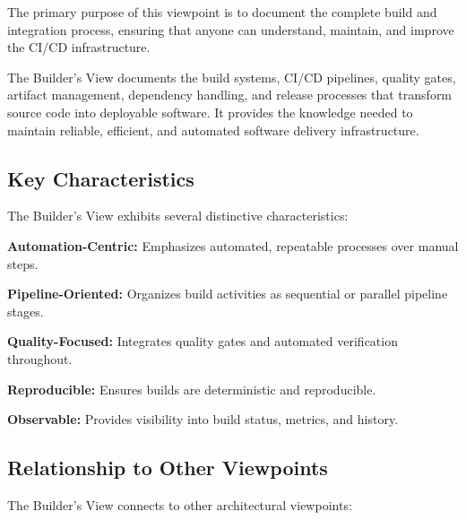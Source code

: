 \documentclass[11pt,letterpaper]{article}
\begin{document}
The primary purpose of this viewpoint is to document the complete build and integration process, ensuring that anyone can understand, maintain, and improve the CI/CD infrastructure.

\begin{definitionbox}
The Builder's View documents the build systems, CI/CD pipelines, quality gates, artifact management, dependency handling, and release processes that transform source code into deployable software. It provides the knowledge needed to maintain reliable, efficient, and automated software delivery infrastructure.
\end{definitionbox}

\subsection{Key Characteristics}

The Builder's View exhibits several distinctive characteristics:

\textbf{Automation-Centric:} Emphasizes automated, repeatable processes over manual steps.

\textbf{Pipeline-Oriented:} Organizes build activities as sequential or parallel pipeline stages.

\textbf{Quality-Focused:} Integrates quality gates and automated verification throughout.

\textbf{Reproducible:} Ensures builds are deterministic and reproducible.

\textbf{Observable:} Provides visibility into build status, metrics, and history.

\subsection{Relationship to Other Viewpoints}

The Builder's View connects to other architectural viewpoints:
\end{document}
